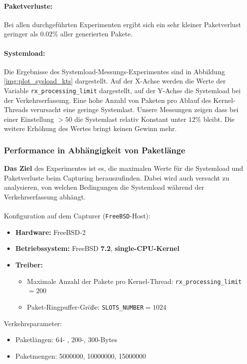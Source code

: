 \paragraph*{Paketverluste:} 
Bei allen durchgeführten Experimenten ergibt sich ein sehr kleiner Paketverlust
geringer als $0.02\%$ aller generierten Pakete.
\paragraph*{Systemload:}
Die Ergebnisse des Systemload-Messungs-Experimentes sind in Abbildung
\ref{img:plot_sysload_kts} dargestellt.  Auf der X-Achse werden die Werte der
Variable \verb+rx_processing_limit+ dargestellt, auf der Y-Achse die Systemload
bei der Verkehrserfassung. Eine hohe Anzahl von Paketen pro Ablauf des
Kernel-Threads verursacht eine geringe Systemlast. Unsere Messungen zeigen dass
bei einer Einstellung $>50$ die Systemlast relativ Konstant unter $12\%$ bleibt. 
Die weitere Erhöhung des Wertes bringt keinen Gewinn mehr.

\subsubsection*{Performance in Abhängigkeit von Paketlänge}
\textbf{Das Ziel} des Experimentes ist es, die maximalen Werte für die
Systemload und Paketverluste beim Capturing herauszufinden. Dabei wird auch
versucht zu analysieren, von welchen Bedingungen die Systemload während der
Verkehrserfassung abhängt.\\\\
%
Konfiguration auf dem Capturer (\verb+FreeBSD+-Host): 
\begin{itemize}
	\item \textbf{Hardware:} FreeBSD-2
	\item \textbf{Betriebssystem:} FreeBSD \textbf{7.2}, \textbf{single-CPU-Kernel}
	\item \textbf{Treiber:} 
		\begin{itemize}
			\item Maximale Anzahl der Pakete pro Kernel-Thread: \verb+rx_processing_limit+$=200$
			\item Paket-Ringpuffer-Größe: \verb+SLOTS_NUMBER+$=1024$
		\end{itemize}
\end{itemize}
Verkehrsparameter:
\begin{itemize}
	\item Paketlängen: 64- , 200-, 300-Bytes
	\item Paketmengen: 5000000, 10000000, 15000000
\end{itemize}

